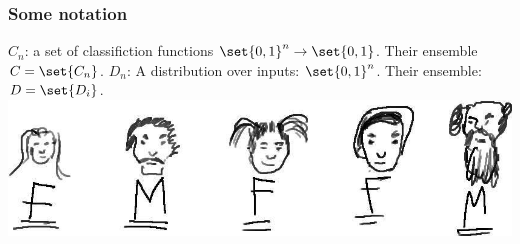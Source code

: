\documentclass{beamer}
\begin{document}
\begin{frame}
\frametitle{Some notation}
\begin{itemize}
\pitem $C_{n}$: a set of classifiction functions $\set{0, 1}^{n} \to \set{0, 1}$. Their ensemble $C = \set{C_{n}}$.
\pitem $D_{n}$: A distribution over inputs: $\set{0,1}^{n}$. Their ensemble: $D = \set{D_{i}}$.\\
\includegraphics[scale=0.15]{images/classifiedFaces.jpg}
\end{itemize}
\end{frame}
\end{document}
